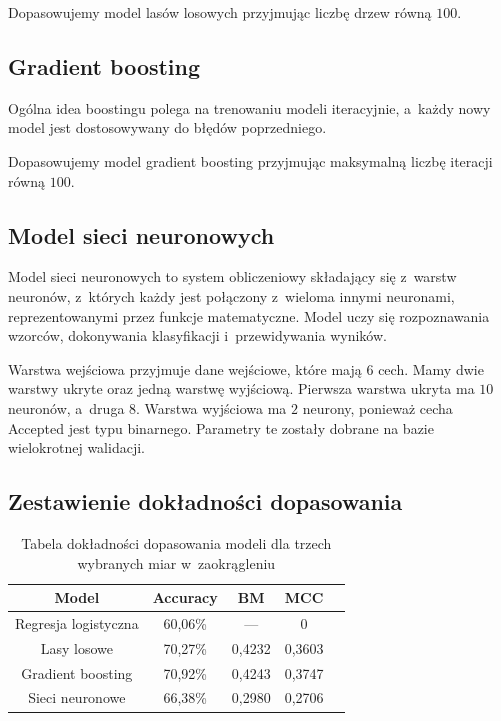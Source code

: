 \documentclass[12pt]{article}
\begin{document}
	\vspace{0.25cm}
	
	Dopasowujemy model lasów losowych przyjmując liczbę drzew równą $100$.
	
	\subsection{Gradient boosting}\label{subsec:gradient-boosting}
	Ogólna idea boostingu polega na trenowaniu modeli iteracyjnie, a~każdy nowy model jest dostosowywany do błędów poprzedniego.
	
	\vspace{0.25cm}
	
	Dopasowujemy model gradient boosting przyjmując maksymalną liczbę iteracji równą $100$.
	
	\subsection{Model sieci neuronowych}\label{subsec:model-sieci-neuronowych}
	Model sieci neuronowych to system obliczeniowy składający się z~warstw neuronów, z~których każdy jest połączony z~wieloma innymi neuronami, reprezentowanymi przez funkcje matematyczne. Model uczy się rozpoznawania wzorców, dokonywania klasyfikacji i~przewidywania wyników.
	
	\vspace{0.25cm}
	
	Warstwa wejściowa przyjmuje dane wejściowe, które mają $6$ cech. Mamy dwie warstwy ukryte oraz jedną warstwę wyjściową. Pierwsza warstwa ukryta ma $10$ neuronów, a~druga $8$. Warstwa wyjściowa ma $2$ neurony, ponieważ cecha Accepted jest typu binarnego. Parametry te zostały dobrane na bazie wielokrotnej walidacji.
	
	\subsection{Zestawienie dokładności dopasowania}\label{subsec:zestawienie-dopasowania-modeli}
	
	\begin{table}[H]
		\centering
		\begin{tabular}{c|cccc}
			\hline\hline
			       Model         & Accuracy &   BM  &  MCC   &  \\\hline
			Regresja logistyczna & 60,06\% &   ---  &   0    &  \\
			    Lasy losowe      & 70,27\% & 0,4232 & 0,3603 &  \\
			 Gradient boosting   & 70,92\% & 0,4243 & 0,3747 &  \\
			  Sieci neuronowe    & 66,38\% & 0,2980 & 0,2706 &  \\\hline
		\end{tabular}
		\caption{Tabela dokładności dopasowania modeli dla trzech wybranych miar w~zaokrągleniu}
		\label{tab:dokladnosc}
	\end{table}
	
\end{document}
